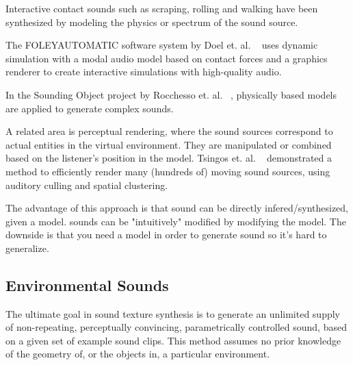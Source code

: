\documentclass{acmsiggraph}               %
\begin{document}
Interactive contact sounds such as scraping, rolling and walking have 
been synthesized by modeling the physics or spectrum of the sound source.

The FOLEYAUTOMATIC software system by Doel et. al. ~ uses dynamic simulation 
with a modal audio model based on contact forces and a graphics renderer to create interactive 
simulations with high-quality audio. 

In the Sounding Object project by Rocchesso et. al. ~, physically based 
models are applied to generate complex sounds. 


A related area is perceptual rendering, where the sound sources 
correspond to actual entities in the virtual environment. They are 
manipulated or combined based on the listener's position in the model. 
Tsingos et. al. ~ demonstrated a method to 
efficiently render many (hundreds of) moving sound sources, using 
auditory culling and spatial clustering. 

The advantage of this approach is that sound can be
directly infered/synthesized, given a model.  sounds can
be "intuitively" modified by modifying the model. The
downside is that you need a model in order to generate
sound so it's hard to generalize.


\subsection{Environmental Sounds}

The ultimate goal in sound texture synthesis is to generate an unlimited 
supply of non-repeating, perceptually convincing, parametrically controlled sound, based on a 
given set of example sound clips. This method assumes no prior knowledge of the geometry of, 
or the objects in, a particular environment.
\end{document}
